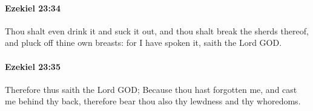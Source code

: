 		\paragraph{Ezekiel 23:34} %
			\label{EZEKIEL-23-34}

			Thou shalt even drink it and suck it out, and thou shalt break the sherds thereof, and pluck off thine own breasts: for I have spoken it, saith the Lord GOD.


		\paragraph{Ezekiel 23:35} %
			\label{EZEKIEL-23-35}

			Therefore thus saith the Lord GOD; Because thou hast forgotten me, and cast me behind thy back, therefore bear thou also thy lewdness and thy whoredoms.


